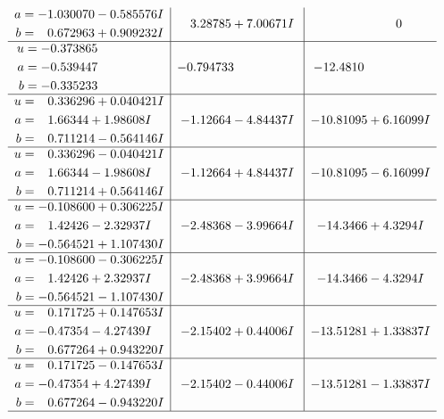 \documentclass[1p]{elsarticle_modified}
\theoremstyle{definition}
\begin{document}
$$\begin{array}{c|c|c}
\begin{aligned}
a &= -1.030070 - 0.585576 I \\
b &= \phantom{-}0.672963 + 0.909232 I\end{aligned}
 & \phantom{-}3.28785 + 7.00671 I & \phantom{-0.000000 } 0 \\ \hline\begin{aligned}
u &= -0.373865\phantom{ +0.000000I} \\
a &= -0.539447\phantom{ +0.000000I} \\
b &= -0.335233\phantom{ +0.000000I}\end{aligned}
 & -0.794733\phantom{ +0.000000I} & -12.4810\phantom{ +0.000000I} \\ \hline\begin{aligned}
u &= \phantom{-}0.336296 + 0.040421 I \\
a &= \phantom{-}1.66344 + 1.98608 I \\
b &= \phantom{-}0.711214 - 0.564146 I\end{aligned}
 & -1.12664 - 4.84437 I & -10.81095 + 6.16099 I \\ \hline\begin{aligned}
u &= \phantom{-}0.336296 - 0.040421 I \\
a &= \phantom{-}1.66344 - 1.98608 I \\
b &= \phantom{-}0.711214 + 0.564146 I\end{aligned}
 & -1.12664 + 4.84437 I & -10.81095 - 6.16099 I \\ \hline\begin{aligned}
u &= -0.108600 + 0.306225 I \\
a &= \phantom{-}1.42426 - 2.32937 I \\
b &= -0.564521 + 1.107430 I\end{aligned}
 & -2.48368 - 3.99664 I & -14.3466 + 4.3294 I \\ \hline\begin{aligned}
u &= -0.108600 - 0.306225 I \\
a &= \phantom{-}1.42426 + 2.32937 I \\
b &= -0.564521 - 1.107430 I\end{aligned}
 & -2.48368 + 3.99664 I & -14.3466 - 4.3294 I \\ \hline\begin{aligned}
u &= \phantom{-}0.171725 + 0.147653 I \\
a &= -0.47354 - 4.27439 I \\
b &= \phantom{-}0.677264 + 0.943220 I\end{aligned}
 & -2.15402 + 0.44006 I & -13.51281 + 1.33837 I \\ \hline\begin{aligned}
u &= \phantom{-}0.171725 - 0.147653 I \\
a &= -0.47354 + 4.27439 I \\
b &= \phantom{-}0.677264 - 0.943220 I\end{aligned}
 & -2.15402 - 0.44006 I & -13.51281 - 1.33837 I\\
 \hline 
 \end{array}$$\newpage\newpage\renewcommand{\arraystretch}{1}
\end{document}
